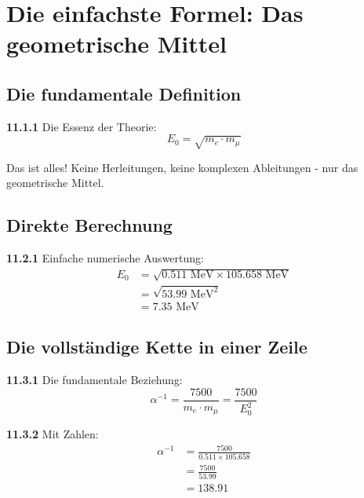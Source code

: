 \documentclass[12pt,a4paper]{article}
\begin{document}
\section{Die einfachste Formel: Das geometrische Mittel}

\subsection{Die fundamentale Definition}

\begin{tcolorbox}[colback=yellow!10!white,colframe=red!75!black,title=\textbf{DIE EINFACHSTE FORMEL}]
	\noindent \textbf{11.1.1} Die Essenz der Theorie:
	\begin{equation}
		\boxed{E_0 = \sqrt{m_e \cdot m_\mu}}
	\end{equation}
	
	Das ist alles! Keine Herleitungen, keine komplexen Ableitungen - nur das geometrische Mittel.
\end{tcolorbox}

\subsection{Direkte Berechnung}

\noindent \textbf{11.2.1} Einfache numerische Auswertung:
\begin{align}
	E_0 &= \sqrt{0.511 \text{ MeV} \times 105.658 \text{ MeV}} \\
	&= \sqrt{53.99 \text{ MeV}^2} \\
	&= 7.35 \text{ MeV}
\end{align}

\subsection{Die vollständige Kette in einer Zeile}

\noindent \textbf{11.3.1} Die fundamentale Beziehung:
\begin{equation}
	\boxed{\alpha^{-1} = \frac{7500}{m_e \cdot m_\mu} = \frac{7500}{E_0^2}}
\end{equation}

\noindent \textbf{11.3.2} Mit Zahlen:
\begin{align}
	\alpha^{-1} &= \frac{7500}{0.511 \times 105.658} \\
	&= \frac{7500}{53.99} \\
	&= 138.91
\end{align}
\end{document}
